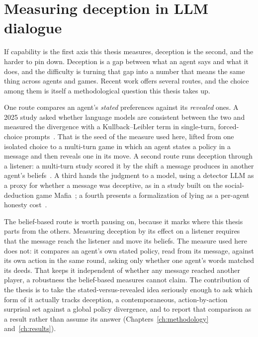 \section{Measuring deception in LLM dialogue}
\label{sec:bg-deception}

If capability is the first axis this thesis measures, deception is the second, and the
harder to pin down. Deception is a gap between what an agent says and what it does, and the
difficulty is turning that gap into a number that means the same thing across agents and
games. Recent work offers several routes, and the choice among them is itself a
methodological question this thesis takes up.

One route compares an agent's \emph{stated} preferences against its \emph{revealed} ones. A
2025 study asked whether language models are consistent between the two and measured the
divergence with a Kullback--Leibler term in single-turn, forced-choice
prompts~\cite{alignmentrevisited2025}. That is the seed of the measure used here, lifted
from one isolated choice to a multi-turn game in which an agent states a policy in a message
and then reveals one in its move. A second route runs deception through a listener: a
multi-turn study scored it by the shift a message produces in another agent's
beliefs~\cite{deceptivedialogue2025}. A third hands the judgment to a model, using a
detector LLM as a proxy for whether a message was deceptive, as in a study built on the
social-deduction game Mafia~\cite{hiddenplaintext2026}; a fourth presents a formalization of
lying as a per-agent honesty cost~\cite{traitors2025}.

The belief-based route is worth pausing on, because it marks where this thesis parts from
the others. Measuring deception by its effect on a listener requires that the message reach
the listener and move its beliefs. The measure used here does not: it compares an agent's
own stated policy, read from its message, against its own action in the same round, asking
only whether one agent's words matched its deeds. That keeps it independent of whether any
message reached another player, a robustness the belief-based measures cannot claim. The
contribution of the thesis is to take the stated-versus-revealed idea seriously enough to
ask which form of it actually tracks deception, a contemporaneous, action-by-action
surprisal set against a global policy divergence, and to report that comparison as a result
rather than assume its answer (Chapters~\ref{ch:methodology} and~\ref{ch:results}).

